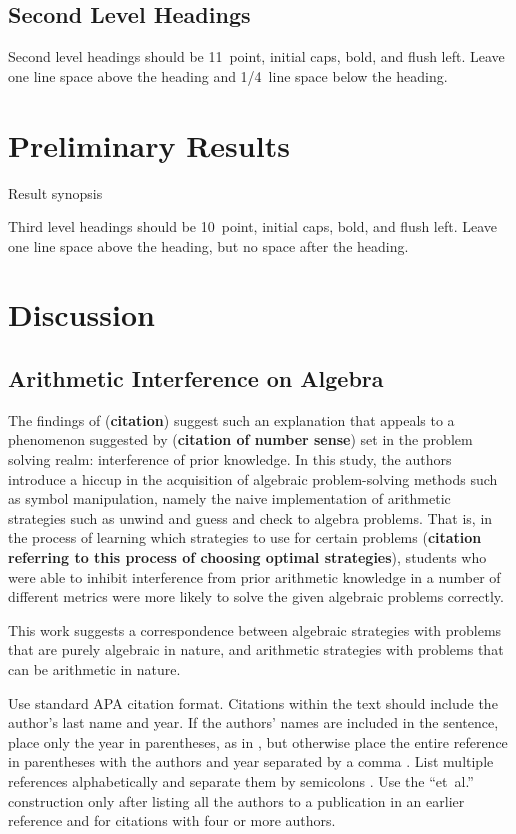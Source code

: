 \documentclass[10pt,letterpaper]{article}
\begin{document}
\subsection{Second Level Headings}

Second level headings should be 11~point, initial caps, bold, and
flush left. Leave one line space above the heading and 1/4~line
space below the heading.

\section{Preliminary Results}

Result synopsis

Third level headings should be 10~point, initial caps, bold, and flush
left. Leave one line space above the heading, but no space after the
heading.


\section{Discussion}

\subsection{Arithmetic Interference on Algebra}

The findings of (\textbf{citation}) suggest such an explanation that appeals to a phenomenon suggested by (\textbf{citation of number sense}) set in the problem solving realm: interference of prior knowledge. In this study, the authors introduce a hiccup in the acquisition of algebraic problem-solving methods such as symbol manipulation, namely the naive implementation of arithmetic strategies such as unwind and guess and check to algebra problems. That is, in the process of learning which strategies to use for certain problems (\textbf{citation referring to this process of choosing optimal strategies}), students who were able to inhibit interference from prior arithmetic knowledge in a number of different metrics were more likely to solve the given algebraic problems correctly.

This work suggests a correspondence between algebraic strategies with problems that are purely algebraic in nature, and arithmetic strategies with problems that can be arithmetic in nature.


Use standard APA citation format. Citations within the text should
include the author's last name and year. If the authors' names are
included in the sentence, place only the year in parentheses, as in
, but otherwise place the entire reference in
parentheses with the authors and year separated by a comma
. List multiple references alphabetically and
separate them by semicolons
. Use the
``et~al.'' construction only after listing all the authors to a
publication in an earlier reference and for citations with four or
more authors.
\end{document}
